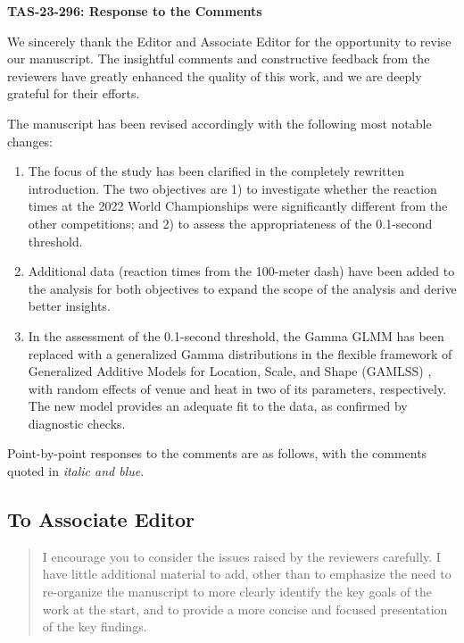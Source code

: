 \documentclass[12pt]{article}
\newenvironment{comment}%
{\begin{quotation}\noindent\small\it\color{darkblue}\ignorespaces%
}{\end{quotation}}
\begin{document}
\begin{center}
  {\Large\bf TAS-23-296: Response to the Comments}
\end{center}

We sincerely thank the Editor and Associate Editor for the opportunity
to revise our manuscript. The insightful comments and constructive
feedback from the reviewers have greatly enhanced the quality of this
work, and we are deeply grateful for their efforts.


The manuscript has been revised accordingly with the following most
notable changes:
\begin{enumerate}
\item
  The focus of the study has been clarified in the completely
  rewritten introduction. The two objectives are 1) to investigate
  whether the reaction times at the 2022 World Championships were
  significantly different from the other competitions; and 2) to
  assess the appropriateness of the 0.1-second threshold.
\item
  Additional data (reaction times from the 100-meter dash) have been
  added to the analysis for both objectives to expand the scope of the
  analysis and derive better insights.
\item
  In the assessment of the 0.1-second threshold, the Gamma GLMM has
  been replaced with a generalized Gamma distributions in the flexible
  framework of Generalized Additive Models for Location, Scale, and
  Shape (GAMLSS) \citep{stasinopoulos2024generalized}, with random
  effects of venue and heat in two of its parameters, respectively.
  The new model provides an adequate fit to the data, as confirmed by
  diagnostic checks.
\end{enumerate}

Point-by-point responses to the comments are as follows, with the
comments quoted in \emph{\color{darkblue} italic and blue}.


\subsection*{To Associate Editor}

\begin{comment}
I encourage you to consider the issues raised by the reviewers carefully. I have
little additional material to add, other than to emphasize the need to
re-organize the manuscript to more clearly identify the key goals of the work at
the start, and to provide a more concise and focused presentation of the key
findings.
\end{comment}
\end{document}
